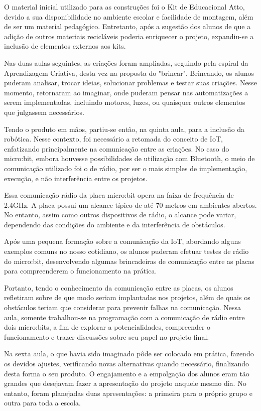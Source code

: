 \documentclass[portuguese]{textolivre}
\begin{document}
O material inicial utilizado para as construções foi o Kit de Educacional Atto, devido a sua disponibilidade no ambiente escolar e facilidade de montagem, além de ser um material pedagógico. Entretanto, após a sugestão dos alunos de que a adição de outros materiais recicláveis poderia enriquecer o projeto, expandiu-se a inclusão de elementos externos aos kits.

Nas duas aulas seguintes, as criações foram ampliadas, seguindo pela espiral da Aprendizagem Criativa, desta vez na proposta do "brincar". Brincando, os alunos puderam analisar, trocar ideias, solucionar problemas  e testar suas criações. Nesse momento, retornaram ao imaginar, onde puderam pensar nas automatizações a serem implementadas, incluindo motores, luzes, ou quaisquer outros elementos que julgassem necessários.

Tendo o produto em mãos, partiu-se então, na quinta aula, para a inclusão da robótica. Nesse contexto, foi necessário a retomada do conceito de IoT, enfatizando principalmente na comunicação entre as criações. No caso do micro:bit, embora houvesse possibilidades de utilização com Bluetooth, o meio de comunicação utilizado foi o de rádio, por ser o mais simples de implementação, execução, e não interferência entre os projetos.

Essa comunicação rádio da placa micro:bit opera na faixa de frequência de 2.4GHz. A placa possui um alcance típico de até 70 metros em ambientes abertos. No entanto, assim como outros dispositivos de rádio, o alcance pode variar, dependendo das condições do ambiente e da interferência de obstáculos.

Após uma pequena formação sobre a comunicação da IoT, abordando alguns exemplos comuns no nosso cotidiano, os alunos puderam efetuar testes de rádio do micro:bit, desenvolvendo algumas brincadeiras de comunicação entre as placas para compreenderem o funcionamento na prática.

Portanto, tendo o conhecimento da comunicação entre as placas, os alunos refletiram sobre de que modo seriam implantadas nos projetos, além de quais os obstáculos teriam que considerar para prevenir falhas na comunicação. Nessa aula, somente trabalhou-se na programação com a comunicação de rádio entre dois micro:bits, a fim de explorar a potencialidades, compreender o funcionamento e trazer discussões sobre seu papel no projeto final.

Na sexta aula, o que havia sido imaginado pôde ser colocado em prática, fazendo os devidos ajustes, verificando novas alternativas quando necessário, finalizando desta forma o seu produto. O engajamento e a empolgação dos alunos eram tão grandes que desejavam fazer a apresentação do projeto naquele mesmo dia. No entanto, foram planejadas duas apresentações: a primeira para o próprio grupo e outra para toda a escola.
\end{document}
